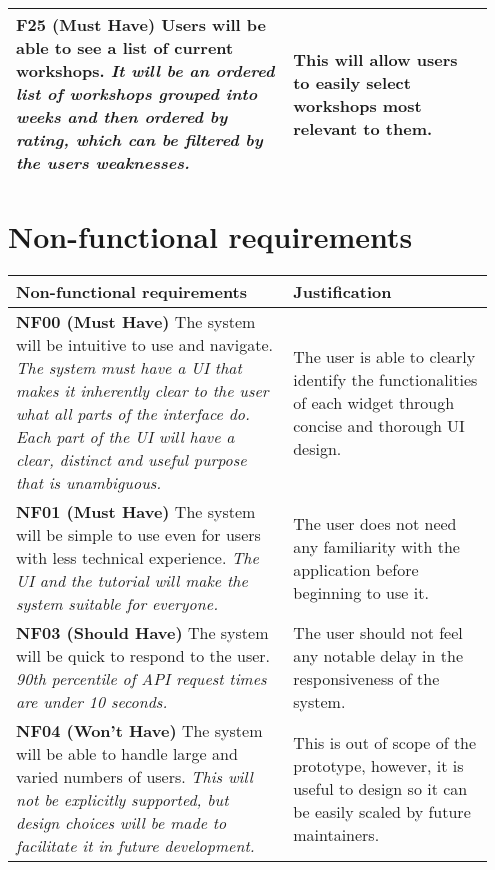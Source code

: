 \documentclass[10pt]{article}
\begin{document}
\begin{longtable}{|p{0.55\linewidth}|p{0.4\linewidth}|}
    \textbf{F25 (Must Have) }
    Users will be able to see a list of current workshops.
    \textit{It will be an ordered list of workshops grouped into weeks and then
    ordered by rating, which can be filtered by the users weaknesses.}
    &
    This will allow users to easily select workshops most relevant to them.
    \\ \hline

\end{longtable}


\vspace{-4mm}\section{Non-functional requirements}\vspace{-2mm}
\begin{longtable}{|p{0.55\linewidth}|p{0.4\linewidth}|}
    \hline
    \textbf{Non-functional requirements}
        &
    \textbf{Justification}
    \\ \hline\hline

    \textbf{NF00 (Must Have) }
    The system will be intuitive to use and navigate.
    \textit{The system must have a UI that makes it inherently clear to the user
    what all parts of the interface do. Each part of the UI will have a clear,
    distinct and useful purpose that is unambiguous.}
        &
    The user is able to clearly identify the functionalities of each widget
    through concise and thorough UI design.
    \\ \hline

    \textbf{NF01 (Must Have) }
    The system will be simple to use even for users with less technical experience.
    \textit{The UI and the tutorial will make the system suitable for everyone.}
        &
    The user does not need any familiarity with the application before beginning
    to use it.
    \\ \hline

    \textbf{NF03 (Should Have) }
    The system will be quick to respond to the user.
    \textit{90th percentile of API request times are under 10 seconds.}
        &
    The user should not feel any notable delay in the responsiveness of the
    system.
    \\ \hline

    \textbf{NF04 (Won't Have) }
    The system will be able to handle large and varied numbers of users.
    \textit{This will not be explicitly supported, but design choices will be
    made to facilitate it in future development.}
        &
    This is out of scope of the prototype, however, it is useful to design so
    it can be easily scaled by future maintainers.
    \\ \hline


\end{longtable}
\end{document}
